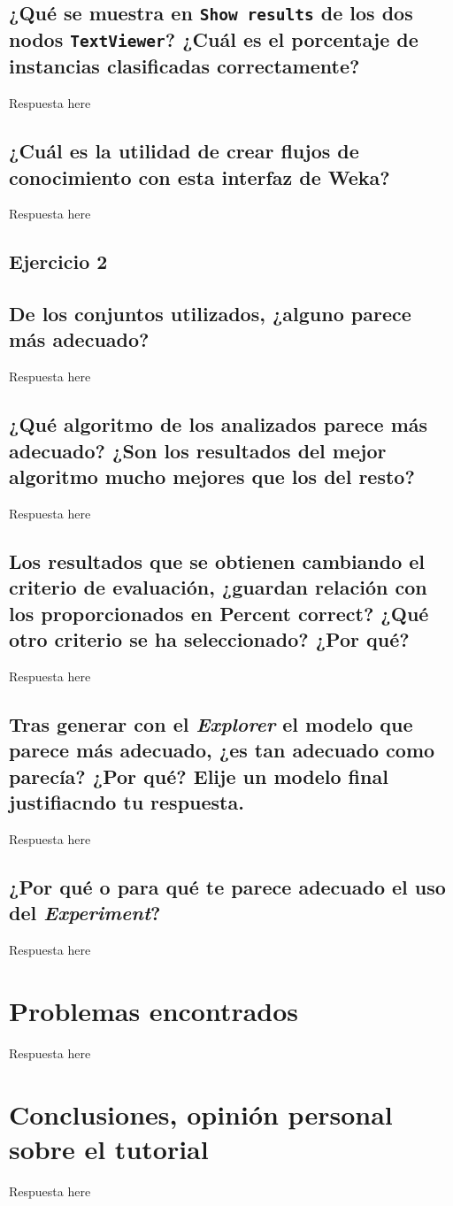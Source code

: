 \documentclass[12pt]{article}
\begin{document}
\subsection*{\small ¿Qué se muestra en \texttt{Show results} de los dos nodos \texttt{TextViewer}? ¿Cuál es el porcentaje de instancias clasificadas correctamente?}

Respuesta here

\subsection*{\small ¿Cuál es la utilidad de crear flujos de conocimiento con esta interfaz de Weka?}

Respuesta here

\begin{center}
\section{Ejercicio 2}
\end{center}


\subsection*{\small De los conjuntos utilizados, ¿alguno parece más adecuado?}

Respuesta here

\subsection*{\small ¿Qué algoritmo de los analizados parece más adecuado? ¿Son los resultados del mejor algoritmo mucho mejores que los del resto?}

Respuesta here

\subsection*{\small Los resultados que se obtienen cambiando el criterio de evaluación, ¿guardan relación con los proporcionados en Percent correct? ¿Qué otro criterio se ha seleccionado? ¿Por qué?}

Respuesta here

\subsection*{\small Tras generar con el \emph{Explorer} el modelo que parece más adecuado, ¿es tan adecuado como parecía? ¿Por qué? Elije un modelo final justifiacndo tu respuesta.}

Respuesta here

\subsection*{\small ¿Por qué o para qué te parece adecuado el uso del \emph{Experiment}?}

Respuesta here

\newpage
\section{Problemas encontrados}

Respuesta here

\section{Conclusiones, opinión personal sobre el tutorial}

Respuesta here
\end{document}
